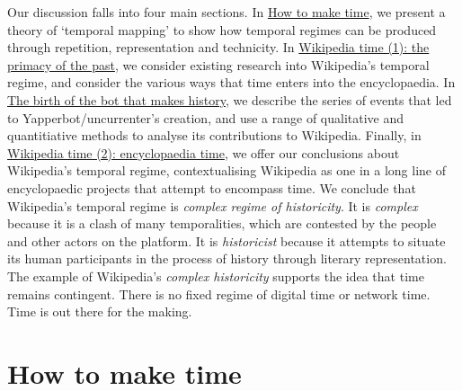 \documentclass[
  Crown,
  times,
  sageh]{sagej}
\begin{document}
Our discussion falls into four main sections. In
\hyperref[how-to-make-time]{How to make time}, we present a theory of
`temporal mapping' to show how temporal regimes can be produced through
repetition, representation and technicity. In
\hyperref[wikipedia-time-1-the-primacy-of-the-past]{Wikipedia time (1):
the primacy of the past}, we consider existing research into Wikipedia's
temporal regime, and consider the various ways that time enters into the
encyclopaedia. In \hyperref[the-birth-of-the-bot-that-makes-history]{The
birth of the bot that makes history}, we describe the series of events
that led to Yapperbot/uncurrenter's creation, and use a range of
qualitative and quantitiative methods to analyse its contributions to
Wikipedia. Finally, in
\hyperref[wikipedia-time-2-encyclopaedia-time]{Wikipedia time (2):
encyclopaedia time}, we offer our conclusions about Wikipedia's temporal
regime, contextualising Wikipedia as one in a long line of encyclopaedic
projects that attempt to encompass time. We conclude that Wikipedia's
temporal regime is \emph{complex regime of historicity}. It is
\emph{complex} because it is a clash of many temporalities, which are
contested by the people and other actors on the platform. It is
\emph{historicist} because it attempts to situate its human participants
in the process of history through literary representation. The example
of Wikipedia's \emph{complex historicity} supports the idea that time
remains contingent. There is no fixed regime of digital time or network
time. Time is out there for the making.

\section{How to make time}\label{how-to-make-time}
\end{document}
